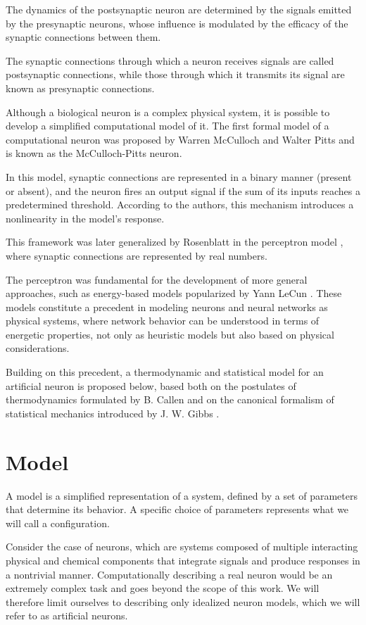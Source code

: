 \documentclass[12pt]{article}
\begin{document}
The dynamics of the postsynaptic neuron are determined by the signals emitted by the presynaptic neurons, whose influence is modulated by the efficacy of the synaptic connections between them.

The synaptic connections through which a neuron receives signals are called postsynaptic connections, while those through which it transmits its signal are known as presynaptic connections.

Although a biological neuron is a complex physical system, it is possible to develop a simplified computational model of it. The first formal model of a computational neuron was proposed by Warren McCulloch and Walter Pitts \cite{mcculloch1943logical} and is known as the McCulloch-Pitts neuron.

In this model, synaptic connections are represented in a binary manner (present or absent), and the neuron fires an output signal if the sum of its inputs reaches a predetermined threshold. According to the authors, this mechanism introduces a nonlinearity in the model's response.

This framework was later generalized by Rosenblatt in the perceptron model \cite{rosenblatt1958perceptron}, where synaptic connections are represented by real numbers.

The perceptron was fundamental for the development of more general approaches, such as energy-based models popularized by Yann LeCun \cite{lecun2006energy}. These models constitute a precedent in modeling neurons and neural networks as physical systems, where network behavior can be understood in terms of energetic properties, not only as heuristic models but also based on physical considerations.

Building on this precedent, a thermodynamic and statistical model for an artificial neuron is proposed below, based both on the postulates of thermodynamics formulated by B. Callen \cite{callen1985thermodynamics} and on the canonical formalism of statistical mechanics introduced by J. W. Gibbs \cite{gibbs1960statistical}.
\section*{Model}

A model is a simplified representation of a system, defined by a set of parameters that determine its behavior. A specific choice of parameters represents what we will call a configuration.

Consider the case of neurons, which are systems composed of multiple interacting physical and chemical components that integrate signals and produce responses in a nontrivial manner. Computationally describing a real neuron would be an extremely complex task and goes beyond the scope of this work. We will therefore limit ourselves to describing only idealized neuron models, which we will refer to as artificial neurons.
\end{document}

